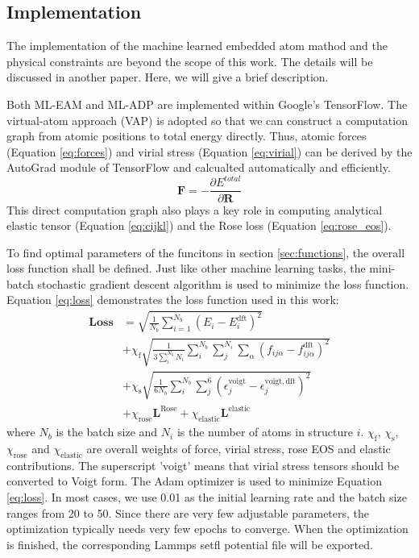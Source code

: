 \documentclass[prb,reprint]{revtex4-2}
\begin{document}
\subsection{Implementation}
\label{sec:implementation}

The implementation of the machine learned embedded atom mathod and the physical
constraints are beyond the scope of this work. The details will be discussed
in another paper. Here, we will give a brief description.

Both ML-EAM and ML-ADP are implemented within Google's TensorFlow. The 
virtual-atom approach (VAP) is adopted so that we can construct a computation 
graph from atomic positions to total energy directly. Thus, atomic forces 
(Equation \ref{eq:forces}) and virial stress (Equation \ref{eq:virial}) can be 
derived by the AutoGrad module of TensorFlow and calcualted automatically and 
efficiently. 
\begin{equation}
\label{eq:forces}
\mathbf{F} = -\frac{\partial E^{total}}{\partial \mathbf{R}}
\end{equation}
This direct computation graph also plays a key role in computing analytical 
elastic tensor (Equation \ref{eq:cijkl}) and the Rose loss 
(Equation \ref{eq:rose_eos}).
 
To find optimal parameters of the funcitons in section \ref{sec:functions}, the 
overall loss function shall be defined. Just like other machine learning tasks, 
the mini-batch stochastic gradient descent algorithm is used to minimize the 
loss function. Equation \ref{eq:loss} demonstrates the loss function used in 
this work:
\begin{align}
\label{eq:loss}
\mathbf{Loss} & = \sqrt{\frac{1}{N_{b}}\sum_{i=1}^{N_{b}}{\left(
    E_{i} - E_{i}^{\mathrm{dft}}
\right)^2}} \nonumber \\
& + \chi_{\mathrm{f}}\sqrt{
    \frac{1}{3\sum_{i}^{N_{b}}{N_i}}\sum_{i}^{N_b}{\sum_{j}^{N_i}{
        \sum_{\alpha}{
            \left(f_{ij\alpha} - f_{ij\alpha}^{\mathrm{dft}}\right)^2
        }
    }}
} \nonumber \\
& + \chi_{\mathrm{s}}\sqrt{\frac{1}{6N_b}\sum_{i}^{N_b}{
    \sum_{j}^{6}{
        \left(
            \epsilon^{\mathrm{voigt}}_{j} - \epsilon^{\mathrm{voigt,dft}}_{j}
        \right)^2
    }
}} \nonumber \\
& + \chi_{\mathrm{rose}}\mathbf{L}^{\mathrm{Rose}} 
+ \chi_{\mathrm{elastic}}\mathbf{L}^{\mathrm{elastic}}
\end{align} 
where $N_{b}$ is the batch size and $N_i$ is the number of atoms in structure 
$i$. $\chi_{\mathrm{f}}$, $\chi_{\mathrm{s}}$, $\chi_{\mathrm{rose}}$ and 
$\chi_{\mathrm{elastic}}$ are overall weights of force, virial stress, rose EOS 
and elastic contributions. The superscript 'voigt' means that virial 
stress tensors should be converted to Voigt form. The Adam optimizer is used to 
minimize Equation \ref{eq:loss}. In most cases, we use 0.01 as the initial 
learning rate and the batch size ranges from 20 to 50. Since there are very few
adjustable parameters, the optimization typically needs very few epochs to 
converge. When the optimization is finished, the corresponding Lammps setfl 
potential file will be exported.
\end{document}
